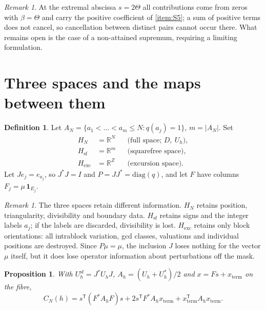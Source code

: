 \documentclass[11pt]{amsart}
\numberwithin{equation}{section}
\theoremstyle{plain}
\newtheorem{proposition}[theorem]{Proposition}
\theoremstyle{definition}
\newtheorem{definition}[theorem]{Definition}
\theoremstyle{remark}
\newtheorem{remark}[theorem]{Remark}
\begin{document}
\begin{remark}
\label{rem:extremal_abscissa}
At the extremal abscissa $s=2\Theta$ all contributions come from zeros
with $\beta=\Theta$ and carry the positive coefficient of \ref{item:S5};
a sum of positive terms does not cancel, so cancellation between distinct
pairs cannot occur there. What remains open is the case of a
non-attained supremum, requiring a limiting formulation.
\end{remark}

\section{Three spaces and the maps between them}
\label{sec:three_spaces}

\begin{definition}
\label{def:three_spaces}
Let $A_N=\{a_1<\dots<a_m\le N: q(a_j)=1\}$, $m=|A_N|$. Set
\begin{align}
H_N&=\mathbb R^N &&\text{(full space; }D,\ U_h\text{)},
\label{eq:space_full}\\
H_{\mathrm{sf}}&=\mathbb R^m &&\text{(squarefree space)},
\label{eq:space_sf}\\
H_{\mathrm{exc}}&=\mathbb R^{Z} &&\text{(excursion space)} .
\label{eq:space_exc}
\end{align}
Let $Je_j=e_{a_j}$, so $J^{*}J=I$ and $P=JJ^{*}=\mathrm{diag}(q)$, and
let $F$ have columns $F_j=\mu\,\mathbf 1_{E_j}$.
\end{definition}

\begin{remark}
\label{rem:information_ledger}
The three spaces retain different information.
$H_N$ retains position, triangularity, divisibility and boundary data.
$H_{\mathrm{sf}}$ retains signs and the integer labels $a_j$; if the
labels are discarded, divisibility is lost. $H_{\mathrm{exc}}$ retains
only block orientations: all intrablock variation, gcd classes,
valuations and individual positions are destroyed.
Since $P\mu=\mu$, the inclusion $J$ loses nothing for the vector $\mu$
itself, but it does lose operator information about perturbations off the
mask.
\end{remark}

\begin{proposition}
\label{prop:fibre_expansion}
With $U_h^{\mathrm{sf}}=J^{*}U_hJ$, $A_h=(U_h+U_h^{*})/2$ and
$x=Fs+x_{\mathrm{term}}$ on the fibre,
\begin{equation}
C_N(h)=s^{\mathsf T}(F^{*}A_hF)s
+2s^{\mathsf T}F^{*}A_hx_{\mathrm{term}}
+x_{\mathrm{term}}^{\mathsf T}A_hx_{\mathrm{term}} .
\label{eq:fibre_expansion}
\end{equation}
\end{proposition}
\end{document}
